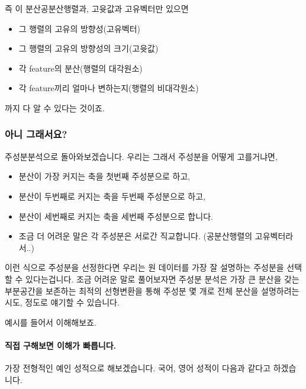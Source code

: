 \documentclass[
]{article}
\providecommand{\tightlist}{%
  \setlength{\itemsep}{0pt}\setlength{\parskip}{0pt}}
\begin{document}
즉 이 분산공분산행렬과, 고윳값과 고유벡터만 있으면

\begin{itemize}
\tightlist
\item
  그 행렬의 고유의 방향성(고유벡터)
\item
  그 행렬의 고유의 방향성의 크기(고윳값)
\item
  각 feature의 분산(행렬의 대각원소)
\item
  각 feature끼리 얼마나 변하는지(행렬의 비대각원소)
\end{itemize}

까지 다 알 수 있다는 것이죠.

\hypertarget{uxc544uxb2c8-uxadf8uxb798uxc11cuxc694}{%
\subsubsection{아니
그래서요?}\label{uxc544uxb2c8-uxadf8uxb798uxc11cuxc694}}

주성분분석으로 돌아와보겠습니다. 우리는 그래서 주성분을 어떻게
고를거냐면,

\begin{itemize}
\tightlist
\item
  분산이 가장 커지는 축을 첫번째 주성분으로 하고,
\item
  분산이 두번째로 커지는 축을 두번째 주성분으로 하고,
\item
  분산이 세번째로 커지는 축을 세번째 주성분으로 합니다.
\item
  조금 더 어려운 말은 각 주성분은 서로간 직교합니다. (공분산행렬의
  고유벡터라서..)
\end{itemize}

이런 식으로 주성분을 선정한다면 우리는 원 데이터를 가장 잘 설명하는
주성분을 선택할 수 있다는겁니다. 조금 어려운 말로 풀어보자면 주성분
분석은 가장 큰 분산을 갖는 부분공간을 보존하는 최적의 선형변환을 통해
주성분 몇 개로 전체 분산을 설명하려는 시도, 정도로 얘기할 수 있습니다.

예시를 들어서 이해해보죠.

\hypertarget{uxc9c1uxc811-uxad6cuxd574uxbcf4uxba74-uxc774uxd574uxac00-uxbe60uxb985uxb2c8uxb2e4.}{%
\paragraph{직접 구해보면 이해가
빠릅니다.}\label{uxc9c1uxc811-uxad6cuxd574uxbcf4uxba74-uxc774uxd574uxac00-uxbe60uxb985uxb2c8uxb2e4.}}

가장 전형적인 예인 성적으로 해보겠습니다. 국어, 영어 성적이 다음과
같다고 하겠습니다.
\end{document}
